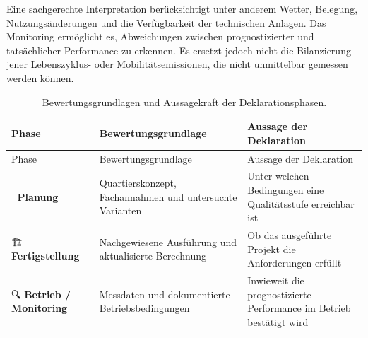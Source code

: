 \documentclass[
  ngerman,
  a4paper,
  DIV=11]{scrreprt}
\begin{document}
Eine sachgerechte Interpretation berücksichtigt unter anderem Wetter,
Belegung, Nutzungsänderungen und die Verfügbarkeit der technischen
Anlagen. Das Monitoring ermöglicht es, Abweichungen zwischen
prognostizierter und tatsächlicher Performance zu erkennen. Es ersetzt
jedoch nicht die Bilanzierung jener Lebenszyklus- oder
Mobilitätsemissionen, die nicht unmittelbar gemessen werden können.

\begin{longtable}[]{@{}
  >{\raggedright\arraybackslash}p{}
  >{\raggedright\arraybackslash}p{}
  >{\raggedright\arraybackslash}p{}@{}}
\caption{Bewertungsgrundlagen und Aussagekraft der
Deklarationsphasen.}\label{tbl-deklarationsphasen}\tabularnewline
\toprule\noalign{}
\begin{minipage}[b]{\linewidth}\raggedright
Phase
\end{minipage} & \begin{minipage}[b]{\linewidth}\raggedright
Bewertungsgrundlage
\end{minipage} & \begin{minipage}[b]{\linewidth}\raggedright
Aussage der Deklaration
\end{minipage} \\
\midrule\noalign{}
\endfirsthead
\toprule\noalign{}
\begin{minipage}[b]{\linewidth}\raggedright
Phase
\end{minipage} & \begin{minipage}[b]{\linewidth}\raggedright
Bewertungsgrundlage
\end{minipage} & \begin{minipage}[b]{\linewidth}\raggedright
Aussage der Deklaration
\end{minipage} \\
\midrule\noalign{}
\endhead
\bottomrule\noalign{}
\endlastfoot
📐 \textbf{Planung} & Quartierskonzept, Fachannahmen und untersuchte
Varianten & Unter welchen Bedingungen eine Qualitätsstufe erreichbar
ist \\
🏗️ \textbf{Fertigstellung} & Nachgewiesene Ausführung und aktualisierte
Berechnung & Ob das ausgeführte Projekt die Anforderungen erfüllt \\
🔍 \textbf{Betrieb / Monitoring} & Messdaten und dokumentierte
Betriebsbedingungen & Inwieweit die prognostizierte Performance im
Betrieb bestätigt wird \\
\end{longtable}
\end{document}
